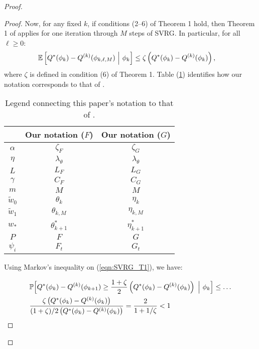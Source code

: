 \begin{proof}
\begin{proof}
Now, for any fixed $k$, if conditions (2--6) of Theorem 1 hold, then Theorem 1 of \citet{Johnson:2013} applies for one iteration through $M$ steps of SVRG. In particular, for all $\ell \geq 0$:
%
\begin{align}
    \mathbb{E} & \left[Q^*(\phi_{k}) - Q^{(k)}(\phi_{k,\ell,M}) ~\Big\vert~ \phi_{k} \right] \leq \zeta \left( Q^*(\phi_{k}) - Q^{(k)}(\phi_k) \right), \label{eqn:SVRG_T1}
\end{align}
%
where $\zeta$ is defined in condition (6) of Theorem 1. Table (\ref{tbl:notation}) identifies how our notation corresponds to that of \citet{Johnson:2013}.
%
\begin{table}[]
\centering
\begin{tabular}{c|c|c}
\citet{Johnson:2013}                  & Our notation ($F$) & Our notation ($G$) \\ \hline
$\alpha$                              & $\zeta_F$     & $\zeta_G$       \\
$\eta$                                & $\lambda_\theta$   & $\lambda_\theta$   \\
$L$                                   & $L_F$              & $L_G$              \\
$\gamma$                              & $C_F$              & $C_G$              \\
$m$                                   & $M$                & $M$                \\
$\tilde{w}_0$                         & $\theta_k$         & $\eta_k$          \\
$\tilde{w}_1$                         & $\theta_{k,M}$     & $\eta_{k,M}$        \\
$w_{*}$                               & $\theta^*_{k+1}$   & $\eta^*_{k+1}$      \\
$P$                                   & $F$                & $G$                \\
$\psi_i$                              & $F_t$              & $G_t$             
\end{tabular}
\caption{Legend connecting this paper's notation to that of \citet{Johnson:2013}.}
\label{tbl:notation}
\end{table}
%
Using Markov's inequality on (\ref{eqn:SVRG_T1}), we have:

\begin{align}
    & \mathbb{P} \Big[Q^*(\phi_{k}) - Q^{(k)}(\phi_{k+1}) \geq \frac{1 + \zeta}{2} \left(Q^*(\phi_{k}) - Q^{(k)}(\phi_{k}) \right) ~\Big\vert~ \phi_{k} \Big] \leq \ldots \\
    & \frac{\zeta \left( Q^*(\phi_{k}) - Q^{(k)}(\phi_k) \right)}{(1+\zeta)/2 \left( Q^*(\phi_{k}) - Q^{(k)}(\phi_k) \right)} = \frac{2}{1 + 1/\zeta} < 1
\end{align}


\end{proof}
\end{proof}
